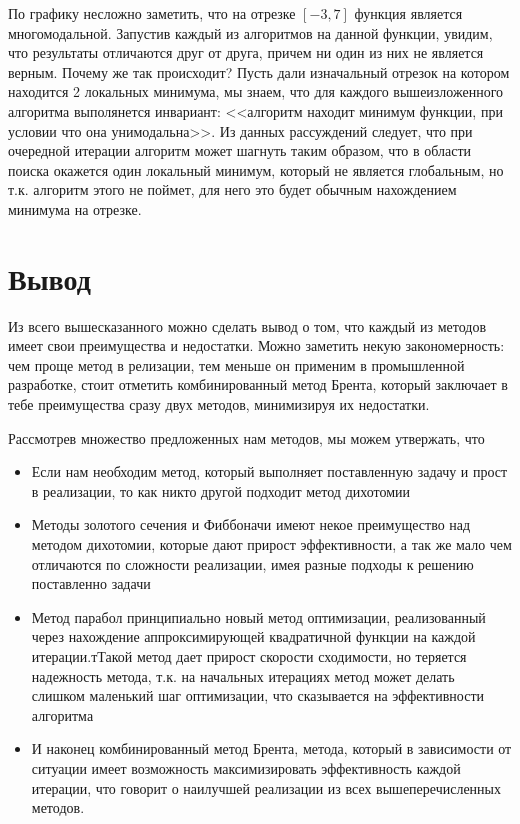 \documentclass[a4paper, 14pt]{article}
\begin{document}
  По графику несложно заметить, что на отрезке $[-3, 7]$ функция является многомодальной. Запустив каждый из алгоритмов на данной функции, увидим, что результаты отличаются друг от друга, причем ни один из них не является верным. Почему же так происходит? Пусть дали изначальный отрезок на котором находится 2 локальных минимума, мы знаем, что для каждого вышеизложенного алгоритма выполянется инвариант: <<алгоритм находит минимум функции, при условии что она унимодальна>>. Из данных рассуждений следует, что при очередной итерации алгоритм может шагнуть таким образом, что в области поиска окажется один локальный минимум, который не является глобальным, но т.к. алгоритм этого не поймет, для него это будет обычным нахождением минимума на отрезке.
  
  
  \section*{Вывод}
  Из всего вышесказанного можно сделать вывод о том, что каждый из методов имеет свои преимущества и недостатки. Можно заметить некую закономерность: чем проще метод в релизации, тем меньше он применим в промышленной разработке, стоит отметить комбинированный метод Брента, который заключает в тебе преимущества сразу двух методов, минимизируя их недостатки. 
  
  Рассмотрев множество предложенных нам методов, мы можем утвержать, что 
  \begin{itemize}
		\item Если нам необходим метод, который выполняет поставленную задачу и прост в реализации, то как никто другой подходит метод дихотомии
		\item Методы золотого сечения и Фиббоначи имеют некое преимущество над методом дихотомии, которые дают прирост эффективности, а так же мало чем отличаются по сложности реализации, имея разные подходы к решению поставленно задачи
		\item Метод парабол принципиально новый метод оптимизации, реализованный через нахождение аппроксимирующей квадратичной функции на каждой итерации.тТакой метод дает прирост скорости сходимости, но теряется надежность метода, т.к. на начальных итерациях метод может делать слишком маленький шаг оптимизации, что сказывается на эффективности алгоритма
		\item И наконец комбинированный метод Брента, метода, который в зависимости от ситуации имеет возможность максимизировать эффективность каждой итерации, что говорит о наилучшей реализации из всех вышеперечисленных методов. 
	\end{itemize}
  
\end{document}
